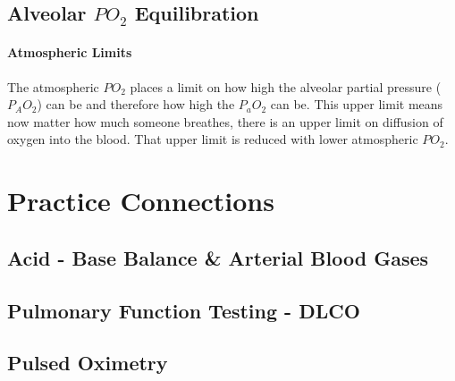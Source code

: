 \subsection{Alveolar $PO_2$ Equilibration}

\paragraph{Atmospheric Limits}

The atmospheric $PO_2$ places a limit on how high the alveolar partial pressure ($P_AO_2$) can be and therefore how high the $P_aO_2$ can be. This upper limit means now matter how much someone breathes, there is an upper limit on diffusion of oxygen into the blood. That upper limit is reduced with lower atmospheric $PO_2$.


\section{Practice Connections}

\subsection{Acid - Base Balance \& Arterial Blood Gases}

\subsection{Pulmonary Function Testing - DLCO}

\subsection{Pulsed Oximetry}

\printbibliography[heading=subbibintoc]
